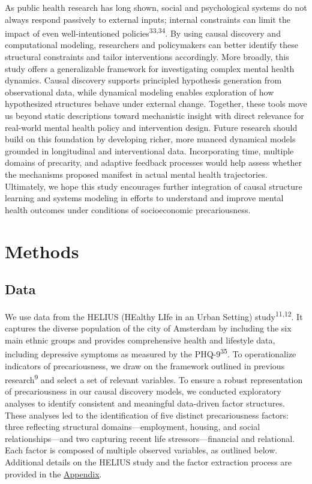 \documentclass[
]{article}
\begin{document}
As public health research has long shown, social and psychological
systems do not always respond passively to external inputs; internal
constraints can limit the impact of even well-intentioned
policies\textsuperscript{33,34}. By using causal discovery and
computational modeling, researchers and policymakers can better identify
these structural constraints and tailor interventions accordingly. More
broadly, this study offers a generalizable framework for investigating
complex mental health dynamics. Causal discovery supports principled
hypothesis generation from observational data, while dynamical modeling
enables exploration of how hypothesized structures behave under external
change. Together, these tools move us beyond static descriptions toward
mechanistic insight with direct relevance for real-world mental health
policy and intervention design. Future research should build on this
foundation by developing richer, more nuanced dynamical models grounded
in longitudinal and interventional data. Incorporating time, multiple
domains of precarity, and adaptive feedback processes would help assess
whether the mechanisms proposed manifest in actual mental health
trajectories. Ultimately, we hope this study encourages further
integration of causal structure learning and systems modeling in efforts
to understand and improve mental health outcomes under conditions of
socioeconomic precariousness.

\section{Methods}\label{sec-methods}

\subsection{Data}\label{data}

We use data from the HELIUS (HEalthy LIfe in an Urban Setting)
study\textsuperscript{11,12}. It captures the diverse population of the
city of Amsterdam by including the six main ethnic groups and provides
comprehensive health and lifestyle data, including depressive symptoms
as measured by the PHQ-9\textsuperscript{35}. To operationalize
indicators of precariousness, we draw on the framework outlined in
previous research\textsuperscript{9} and select a set of relevant
variables. To ensure a robust representation of precariousness in our
causal discovery models, we conducted exploratory analyses to identify
consistent and meaningful data-driven factor structures. These analyses
led to the identification of five distinct precariousness factors: three
reflecting structural domains---employment, housing, and social
relationships---and two capturing recent life stressors---financial and
relational. Each factor is composed of multiple observed variables, as
outlined below. Additional details on the HELIUS study and the factor
extraction process are provided in the
\hyperref[sec-appendix]{Appendix}.
\end{document}

